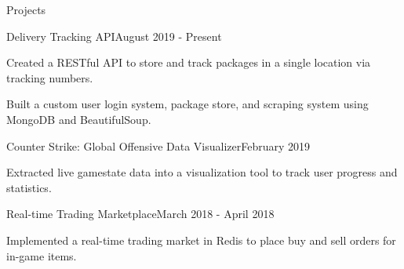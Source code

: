 \documentclass{resume}
\begin{document}
  \begin{rSection}{Projects}
  
      \begin{rSubsection}{Delivery Tracking API}{August 2019 - Present}{}{}
    \item Created a RESTful API to store and track packages in a single location via tracking numbers.
    \item Built a custom user login system, package store, and scraping system using MongoDB and BeautifulSoup.
  \end{rSubsection}
  
    \begin{rSubsection}{Counter Strike: Global Offensive Data Visualizer}{February 2019}{}{}
    \item Extracted live gamestate data into a visualization tool to track user progress and statistics.
  \end{rSubsection}
  
  \begin{rSubsection}{Real-time Trading Marketplace}{March 2018 - April 2018}{}{}
      \item Implemented a real-time trading market in Redis to place buy and sell orders for in-game items.
  \end{rSubsection}

  \end{rSection}
  

  
  
\end{document}
